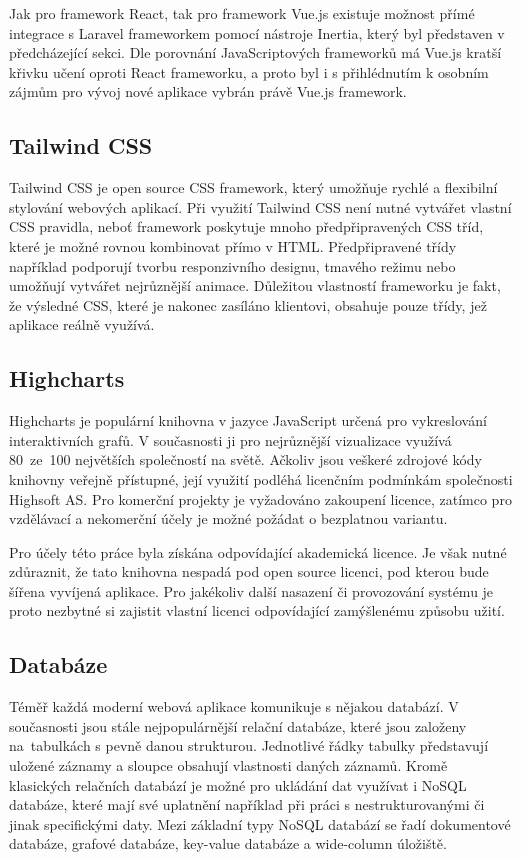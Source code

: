 Jak pro framework React, tak pro framework Vue.js existuje možnost přímé integrace s Laravel frameworkem pomocí nástroje Inertia, který byl představen v předcházející sekci. \cite{inertia} Dle porovnání JavaScriptových frameworků \cite{js-frameworks-comparison-1} má Vue.js kratší křivku učení oproti React frameworku, a proto byl i s přihlédnutím k osobním zájmům pro vývoj nové aplikace vybrán právě Vue.js framework.

\subsection{Tailwind CSS}
Tailwind CSS je open source CSS framework, který umožňuje rychlé a flexibilní stylování webových aplikací. Při využití Tailwind CSS není nutné vytvářet vlastní CSS pravidla, neboť framework poskytuje mnoho předpřipravených CSS tříd, které je možné rovnou kombinovat přímo v HTML. Předpřipravené třídy například podporují tvorbu responzivního designu, tmavého režimu nebo umožňují vytvářet nejrůznější animace. Důležitou vlastností frameworku je fakt, že výsledné CSS, které je nakonec zasíláno klientovi, obsahuje pouze třídy, jež aplikace reálně využívá. \cite{tailwind}

\subsection{Highcharts}
Highcharts je populární knihovna v jazyce JavaScript určená pro vykreslování interaktivních grafů. V současnosti ji pro nejrůznější vizualizace využívá 80~ze~100 největších společností na světě. \cite{Highcharts} Ačkoliv jsou veškeré zdrojové kódy knihovny veřejně přístupné, její využití podléhá licenčním podmínkám společnosti Highsoft AS. Pro komerční projekty je vyžadováno zakoupení licence, zatímco pro vzdělávací a nekomerční účely je možné požádat o bezplatnou variantu. \cite{Highcharts-licences}

Pro účely této práce byla získána odpovídající akademická licence. Je však nutné zdůraznit, že tato knihovna nespadá pod open source licenci, pod kterou bude šířena vyvíjená aplikace. Pro jakékoliv další nasazení či provozování systému je proto nezbytné si zajistit vlastní licenci odpovídající zamýšlenému způsobu užití.

\subsection{Databáze}
Téměř každá moderní webová aplikace komunikuje s nějakou databází. V současnosti jsou stále nejpopulárnější relační databáze, které jsou založeny na~tabulkách s pevně danou strukturou. Jednotlivé řádky tabulky představují uložené záznamy a sloupce obsahují vlastnosti daných záznamů. \cite{db-engines-ranking, relational-databases} Kromě klasických relačních databází je možné pro ukládání dat využívat i NoSQL databáze, které mají své uplatnění například při práci s nestrukturovanými či jinak specifickými daty. Mezi základní typy NoSQL databází se řadí dokumentové databáze, grafové databáze, key-value databáze a wide-column úložiště.~\cite{nosql}

